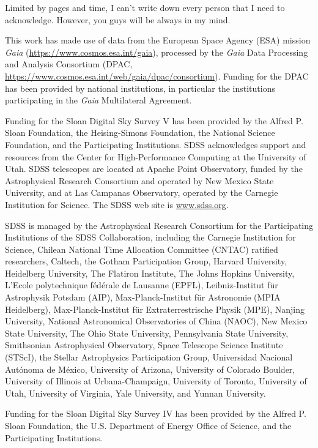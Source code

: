 \documentclass[12pt, a4paper]{memoir}
\begin{document}
Limited by pages and time, I can't write down every person that I need to acknowledge. However, you guys will be always in my mind. 

\newpage

This work has made use of data from the European Space Agency (ESA) mission
{\itshape Gaia} (\url{https://www.cosmos.esa.int/gaia}), processed by the {\itshape Gaia}
Data Processing and Analysis Consortium (DPAC,
\url{https://www.cosmos.esa.int/web/gaia/dpac/consortium}). Funding for the DPAC
has been provided by national institutions, in particular the institutions
participating in the {\itshape Gaia} Multilateral Agreement.

Funding for the Sloan Digital Sky Survey V has been provided by the Alfred P. Sloan Foundation, the Heising-Simons Foundation, the National Science Foundation, and the Participating Institutions. SDSS acknowledges support and resources from the Center for High-Performance Computing at the University of Utah. SDSS telescopes are located at Apache Point Observatory, funded by the Astrophysical Research Consortium and operated by New Mexico State University, and at Las Campanas Observatory, operated by the Carnegie Institution for Science. The SDSS web site is \url{www.sdss.org}.

SDSS is managed by the Astrophysical Research Consortium for the Participating Institutions of the SDSS Collaboration, including the Carnegie Institution for Science, Chilean National Time Allocation Committee (CNTAC) ratified researchers, Caltech, the Gotham Participation Group, Harvard University, Heidelberg University, The Flatiron Institute, The Johns Hopkins University, L'Ecole polytechnique f\'{e}d\'{e}rale de Lausanne (EPFL), Leibniz-Institut f\"{u}r Astrophysik Potsdam (AIP), Max-Planck-Institut f\"{u}r Astronomie (MPIA Heidelberg), Max-Planck-Institut f\"{u}r Extraterrestrische Physik (MPE), Nanjing University, National Astronomical Observatories of China (NAOC), New Mexico State University, The Ohio State University, Pennsylvania State University, Smithsonian Astrophysical Observatory, Space Telescope Science Institute (STScI), the Stellar Astrophysics Participation Group, Universidad Nacional Aut\'{o}noma de M\'{e}xico, University of Arizona, University of Colorado Boulder, University of Illinois at Urbana-Champaign, University of Toronto, University of Utah, University of Virginia, Yale University, and Yunnan University.  

Funding for the Sloan Digital Sky 
Survey IV has been provided by the 
Alfred P. Sloan Foundation, the U.S. 
Department of Energy Office of 
Science, and the Participating 
Institutions. 
\end{document}
